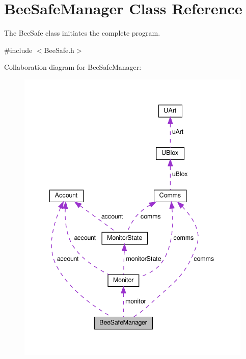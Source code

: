 \hypertarget{class_bee_safe_manager}{}\section{Bee\+Safe\+Manager Class Reference}
\label{class_bee_safe_manager}


The Bee\+Safe class initiates the complete program.  




{\ttfamily \#include $<$Bee\+Safe.\+h$>$}



Collaboration diagram for Bee\+Safe\+Manager\+:
\nopagebreak
\begin{figure}[H]
\begin{center}
\leavevmode
\includegraphics[width=341pt]{d7/d13/class_bee_safe_manager__coll__graph}
\end{center}
\end{figure}

